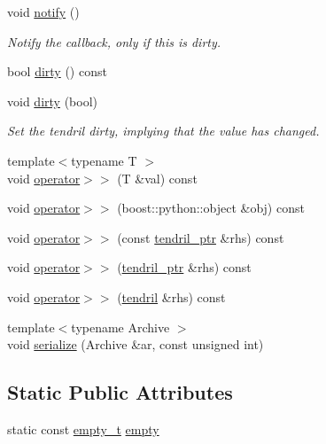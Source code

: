 \begin{DoxyCompactItemize}
\item 
void \hyperlink{classecto_1_1tendril_a87c2df829c12bcd46089d74183c1d8d8}{notify} ()
\begin{DoxyCompactList}\small\item\em Notify the callback, only if this is dirty. \end{DoxyCompactList}\item 
bool \hyperlink{classecto_1_1tendril_aabe2c05389023df143746b5b63b7701e}{dirty} () const 
\item 
void \hyperlink{classecto_1_1tendril_a9c2bb6262190404d3b1648cdcc2960d8}{dirty} (bool)
\begin{DoxyCompactList}\small\item\em Set the tendril dirty, implying that the value has changed. \end{DoxyCompactList}\item 
{\footnotesize template$<$typename T $>$ }\\void \hyperlink{classecto_1_1tendril_a0c843f467b21eee9e5bba8f3f8bc14aa}{operator$>$$>$} (T \&val) const 
\item 
void \hyperlink{classecto_1_1tendril_af019a42fb91908e32db96b84f4a0f978}{operator$>$$>$} (boost\+::python\+::object \&obj) const 
\item 
void \hyperlink{classecto_1_1tendril_aade5aa6d8c439ff515e312f5c9950ec9}{operator$>$$>$} (const \hyperlink{namespaceecto_a84fb5f6130275382e5cbeb5fdececa78}{tendril\+\_\+ptr} \&rhs) const 
\item 
void \hyperlink{classecto_1_1tendril_aaa5858033151487cab9e98e50c79887b}{operator$>$$>$} (\hyperlink{namespaceecto_a84fb5f6130275382e5cbeb5fdececa78}{tendril\+\_\+ptr} \&rhs) const 
\item 
void \hyperlink{classecto_1_1tendril_ad0b2e6eaec37bd46a474ed974ab4272b}{operator$>$$>$} (\hyperlink{classecto_1_1tendril}{tendril} \&rhs) const 
\item 
{\footnotesize template$<$typename Archive $>$ }\\void \hyperlink{classecto_1_1tendril_a697125cfa2b1b53ada4e5e2ee6847181}{serialize} (Archive \&ar, const unsigned int)
\end{DoxyCompactItemize}
\subsection*{Static Public Attributes}
\begin{DoxyCompactItemize}
\item 
static const \hyperlink{structecto_1_1tendril_1_1empty__t}{empty\+\_\+t} \hyperlink{classecto_1_1tendril_ab8098c05197f972a821c8b094b9a6010}{empty}
\end{DoxyCompactItemize}
